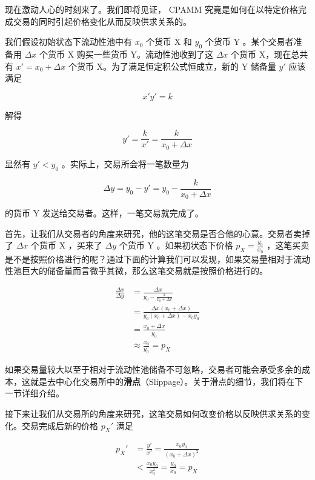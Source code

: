 \documentclass[12pt, a4paper, oneside]{ctexart}
\begin{document}
现在激动人心的时刻来了。我们即将见证， CPAMM 究竟是如何在以特定价格完成交易的同时引起价格变化从而反映供求关系的。

我们假设初始状态下流动性池中有 $x_0$ 个货币 X 和 $y_0$ 个货币 Y 。某个交易者准备用 $\Delta x$ 个货币 X 购买一些货币 Y。流动性池收到了这 $\Delta x$ 个货币 X，现在总共有 $x'=x_0+\Delta x$ 个货币 X。为了满足恒定积公式恒成立，新的 Y 储备量 $y'$ 应该满足

\begin{equation}
    x'y'=k
\end{equation}

解得

\begin{equation}
    y'=\frac{k}{x'}=\frac{k}{x_0+\Delta x}
\end{equation}

显然有 $y' < y_0$ 。实际上，交易所会将一笔数量为

\begin{equation}
    \Delta y = y_0 - y' = y_0 - \frac{k}{x_0+\Delta x}
\end{equation}

的货币 Y 发送给交易者。这样，一笔交易就完成了。

首先，让我们从交易者的角度来研究，他的这笔交易是否合他的心意。交易者卖掉了 $\Delta x$ 个货币 X ，买来了 $\Delta y$ 个货币 Y 。如果初状态下价格 $\displaystyle p_X = \frac{y_0}{x_0}$ ，这笔买卖是不是按照价格进行的呢？通过下面的计算我们可以发现，如果交易量相对于流动性池巨大的储备量而言微乎其微，那么这笔交易就是按照价格进行的。

\begin{equation}
\begin{aligned}
    \frac{\Delta x}{\Delta y} 
    & = \frac{\Delta x}{y_0-\frac{k}{x_0+\Delta x}} \\
    & = \frac{\Delta x (x_0+\Delta x)}{y_0 (x_0+\Delta x) - x_0y_0} \\
    & = \frac{x_0 + \Delta x}{y_0} \\
    & \approx \frac{x_0}{y_0} = p_X
\end{aligned}
\end{equation}

如果交易量较大以至于相对于流动性池储备不可忽略，交易者可能会承受多余的成本，这就是去中心化交易所中的\textbf{滑点}（Slippage）。关于滑点的细节，我们将在下一节详细介绍。

接下来让我们从交易所的角度来研究，这笔交易如何改变价格以反映供求关系的变化。交易完成后新的价格 $p_X'$ 满足

\begin{equation}
\begin{aligned}
    p_X' 
    & = \frac{y'}{x'} = \frac{x_0y_0}{(x_0+\Delta x)^2} \\
    & < \frac{x_0y_0}{x_0^2} = \frac{y_0}{x_0} = p_X
\end{aligned}
\end{equation}
\end{document}
